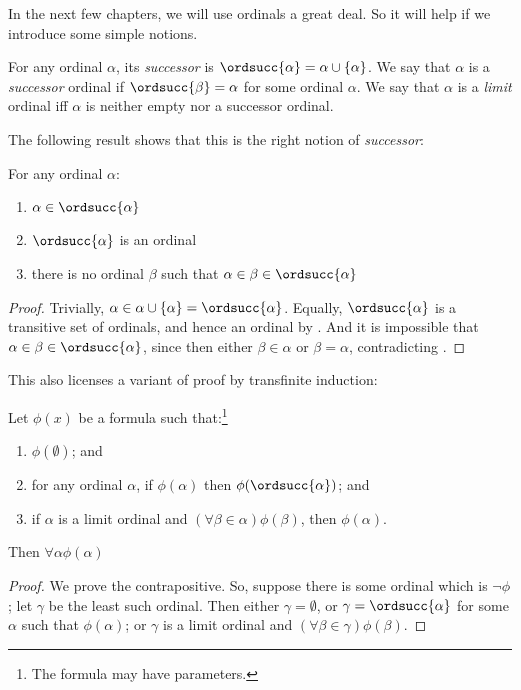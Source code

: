 \documentclass[../../../include/open-logic-section]{subfiles}
\begin{document}
In the next few chapters, we will use ordinals a great deal. So it will help if we introduce some simple notions. 
\begin{defn}
	For any ordinal $\alpha$, its \emph{successor} is $\ordsucc{\alpha} =\alpha \cup \{\alpha\}$. We say that $\alpha$ is a \emph{successor} ordinal if $\ordsucc{\beta} = \alpha$ for some ordinal $\alpha$. We say that $\alpha$ is a \emph{limit} ordinal iff $\alpha$ is neither empty nor a successor ordinal.
\end{defn}\noindent
The following result shows that this is the right notion of \emph{successor}:
\begin{prop}
	For any ordinal $\alpha$:
	\begin{enumerate}
		\item $\alpha \in \ordsucc{\alpha}$ 
		\item $\ordsucc{\alpha}$ is an ordinal
		\item there is no ordinal $\beta$ such that $\alpha \in \beta \in \ordsucc{\alpha}$
	\end{enumerate}
\end{prop}
\begin{proof}
	Trivially, $\alpha \in \alpha \cup \{\alpha\} = \ordsucc{\alpha}$. Equally, $\ordsucc{\alpha}$ is a transitive set of ordinals, and hence an ordinal by . And it is impossible that $\alpha \in \beta \in \ordsucc{\alpha}$, since then either $\beta \in \alpha$ or $\beta = \alpha$, contradicting .
\end{proof}\noindent
This also licenses a variant of proof by transfinite induction:
\begin{thm} Let $\phi(x)$ be a formula such that:\footnote{The formula may have parameters.} 
	\begin{enumerate}
		\item $\phi(\emptyset)$; and
		\item for any ordinal $\alpha$, if $\phi(\alpha)$ then $\phi(\ordsucc{\alpha})$; and 
		\item if $\alpha$ is a limit ordinal and $(\forall \beta \in \alpha)\phi(\beta)$, then $\phi(\alpha)$.
	\end{enumerate}
Then $\forall \alpha \phi(\alpha)$
\end{thm}
\begin{proof}
	We prove the contrapositive. So, suppose there is some ordinal which is $\lnot\phi$; let $\gamma$ be the least such ordinal. Then either $\gamma = \emptyset$, or $\gamma = \ordsucc{\alpha}$ for some $\alpha$ such that $\phi(\alpha)$; or $\gamma$ is a limit ordinal and $(\forall \beta \in \gamma)\phi(\beta)$.
\end{proof}	\noindent
\end{document}
